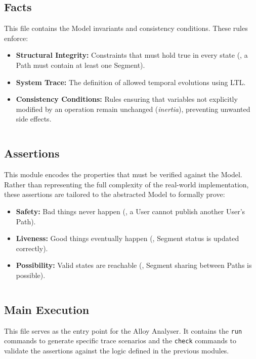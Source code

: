\begin{code}
    \inputminted{alloy}{code/predicates.als}
\end{code}

\subsection{Facts}
This file contains the Model invariants and consistency conditions. These rules enforce:
\begin{itemize}
    \item \textbf{Structural Integrity:} Constraints that must hold true in every state (\eg, a Path must contain at least one Segment).
    \item \textbf{System Trace:} The definition of allowed temporal evolutions using LTL.
    \item \textbf{Consistency Conditions:} Rules ensuring that variables not explicitly modified by an operation remain unchanged (\emph{inertia}), preventing unwanted side effects.
\end{itemize}

\begin{code}
    \inputminted{alloy}{code/facts.als}
\end{code}

\subsection{Assertions}
This module encodes the properties that must be verified against the Model.
Rather than representing the full complexity of the real-world implementation, these assertions are tailored to the abstracted Model to formally prove:
\begin{itemize}
    \item \textbf{Safety:} Bad things never happen (\eg, a User cannot publish another User's Path).
    \item \textbf{Liveness:} Good things eventually happen (\eg, Segment status is updated correctly).
    \item \textbf{Possibility:} Valid states are reachable (\eg, Segment sharing between Paths is possible).
\end{itemize}

\begin{code}
    \inputminted{alloy}{code/assertions.als}
\end{code}

\subsection{Main Execution}
This file serves as the entry point for the Alloy Analyser. It contains the \texttt{run} commands to generate specific trace scenarios and the \texttt{check} commands to validate the assertions against the logic defined in the previous modules.

